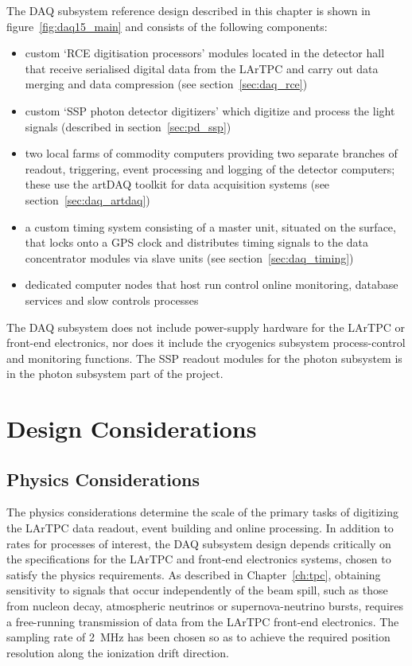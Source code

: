 The DAQ subsystem reference design described in this chapter is shown
in figure~\ref{fig:daq15_main} and consists of the following
components:
\begin{itemize}
  \item custom `RCE digitisation processors' modules located in the
    detector hall that receive serialised digital data from the LArTPC
    and carry out data merging and data compression (see
    section~\ref{sec:daq_rce})
  \item custom `SSP photon detector digitizers' which digitize and
    process the light signals (described in section~\ref{sec:pd_ssp}) 
  \item two local farms of commodity computers providing two separate
    branches of readout, triggering, event processing and logging of the
    detector computers; these use the artDAQ toolkit for data
    acquisition systems (see section~\ref{sec:daq_artdaq})
  \item a custom timing system consisting of a master unit, situated
    on the surface, that locks onto a GPS clock and distributes timing
    signals to the data concentrator modules via slave units (see
    section~\ref{sec:daq_timing})
  \item dedicated computer nodes that host run control online
    monitoring, database services and slow controls processes
\end{itemize}
%
The DAQ subsystem does not include power-supply hardware for the
LArTPC or front-end electronics, nor does it include the cryogenics
subsystem process-control and monitoring functions.  The SSP readout
modules for the photon subsystem is in the photon subsystem part of
the project.

\section{Design Considerations}

\subsection{Physics Considerations}

The physics considerations determine the scale of the primary tasks of
digitizing the LArTPC data readout, event building and online
processing.  In addition to rates for processes of interest, the DAQ
subsystem design depends critically on the specifications for the
LArTPC and front-end electronics systems, chosen to satisfy the \LBNE
physics requirements.  As described in Chapter~\ref{ch:tpc}, obtaining
sensitivity to signals that occur independently of the \LBNE beam
spill, such as those from nucleon decay, atmospheric neutrinos or
supernova-neutrino bursts, requires a free-running transmission of
data from the LArTPC front-end electronics.  The sampling rate of
2~MHz has been chosen so as to achieve the required position
resolution along the ionization drift direction.

